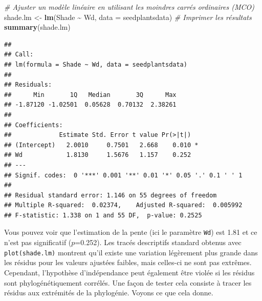 \documentclass[
]{book}
\newenvironment{Shaded}{\begin{snugshade}}{\end{snugshade}}
\newcommand{\AttributeTok}[1]{\textcolor[rgb]{0.13,0.29,0.53}{#1}}
\newcommand{\CommentTok}[1]{\textcolor[rgb]{0.56,0.35,0.01}{\textit{#1}}}
\newcommand{\FunctionTok}[1]{\textcolor[rgb]{0.13,0.29,0.53}{\textbf{#1}}}
\newcommand{\NormalTok}[1]{#1}
\newcommand{\OtherTok}[1]{\textcolor[rgb]{0.56,0.35,0.01}{#1}}
\newcommand{\SpecialCharTok}[1]{\textcolor[rgb]{0.81,0.36,0.00}{\textbf{#1}}}
\begin{document}
\begin{Shaded}
\begin{Highlighting}[]
\CommentTok{\# Ajuster un modèle linéaire en utilisant les moindres carrés ordinaires (MCO)}
\NormalTok{shade.lm }\OtherTok{\textless{}{-}} \FunctionTok{lm}\NormalTok{(Shade }\SpecialCharTok{\textasciitilde{}}\NormalTok{ Wd, }\AttributeTok{data =}\NormalTok{ seedplantsdata)}
\CommentTok{\# Imprimer les résultats}
\FunctionTok{summary}\NormalTok{(shade.lm)}
\end{Highlighting}
\end{Shaded}

\begin{verbatim}
## 
## Call:
## lm(formula = Shade ~ Wd, data = seedplantsdata)
## 
## Residuals:
##      Min       1Q   Median       3Q      Max 
## -1.87120 -1.02501  0.05628  0.70132  2.38261 
## 
## Coefficients:
##             Estimate Std. Error t value Pr(>|t|)  
## (Intercept)   2.0010     0.7501   2.668    0.010 *
## Wd            1.8130     1.5676   1.157    0.252  
## ---
## Signif. codes:  0 '***' 0.001 '**' 0.01 '*' 0.05 '.' 0.1 ' ' 1
## 
## Residual standard error: 1.146 on 55 degrees of freedom
## Multiple R-squared:  0.02374,    Adjusted R-squared:  0.005992 
## F-statistic: 1.338 on 1 and 55 DF,  p-value: 0.2525
\end{verbatim}

Vous pouvez voir que l'estimation de la pente (ici le paramètre \texttt{Wd}) est 1.81 et ce n'est pas significatif (\(p\)=0.252). Les tracés descriptifs standard obtenus avec \texttt{plot(shade.lm)} montrent qu'il existe une variation légèrement plus grande dans les résidus pour les valeurs ajustées faibles, mais celles-ci ne sont pas extrêmes. Cependant, l'hypothèse d'indépendance peut également être violée si les résidus sont phylogénétiquement corrélés. Une façon de tester cela consiste à tracer les résidus aux extrémités de la phylogénie. Voyons ce que cela donne.
\end{document}
